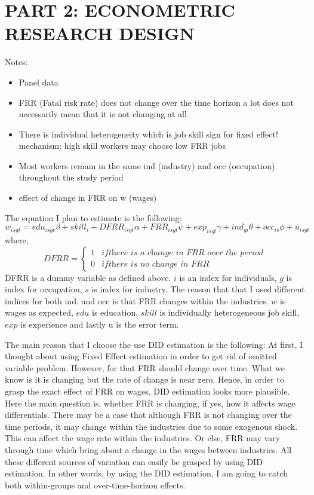 \documentclass[11pt]{article}
\begin{document}
\section*{PART 2: ECONOMETRIC RESEARCH DESIGN}
Notes:
\begin{itemize}
\item Panel data
\item FRR (Fatal risk rate) does not change over the time horizon a lot
    \subitem does not necessarily mean that it is not changing at all
\item There is individual heterogeneity which is job skill 
   \subitem sign for fixed effect!
   \subitem mechanism: high skill workers may choose low FRR jobs
\item Most workers remain in the same ind (industry) and occ (occupation) throughout the study period
\item effect of change in FRR on w (wages)
\end{itemize}

The equation I plan to estimate is the following:
\begin{equation}
w_{isgt}=edu_{isgt}\beta+skill_{i}+DFRR_{isgt}\alpha+FRR_{isgt}\psi+exp_{isgt}\gamma + ind_{gi}\theta + occ_{is}\phi+u_{isgt} \nonumber
\end{equation}
where,
\begin{displaymath}
   DFRR = \left\{
     \begin{array}{lr}
       1 &  if \textit{there is a change in FRR over the period}\\
       0 &  if \textit{there is no change in FRR}
     \end{array}
   \right.
\end{displaymath} 
DFRR is a dummy variable as defined above. $i$ is an index for individuals, $g$ is index for occupation, $s$ is index for industry. The reason that that I used different indices for both ind. and occ is that FRR changes within the industries. $w$ is wages as expected, $edu$ is education, $skill$ is individually heterogeneous job skill, $exp$ is experience and lastly u is the error term. 

The main reason that I choose the use DID estimation is the following: At first, I thought about using Fixed Effect estimation in order to get rid of omitted variable problem. However, for that FRR should change over time. What we know is it is changing but the rate of change is near zero. Hence, in order to grasp the exact effect of FRR on wages, DID estimation looks more plausible. Here the main question is, whether FRR is changing, if yes, how it affects wage differentials. There may be a case that although FRR is not changing over the time periods, it may change within the industries due to some exogenous shock. This can affect the wage rate within the industries. Or else, FRR may vary through time which bring about a change in the wages between industries. All these different sources of variation can easily be grasped by using DID estimation. In other words, by using the DID estimation, I am going to catch both within-groups and over-time-horizon effects.
\end{document}
